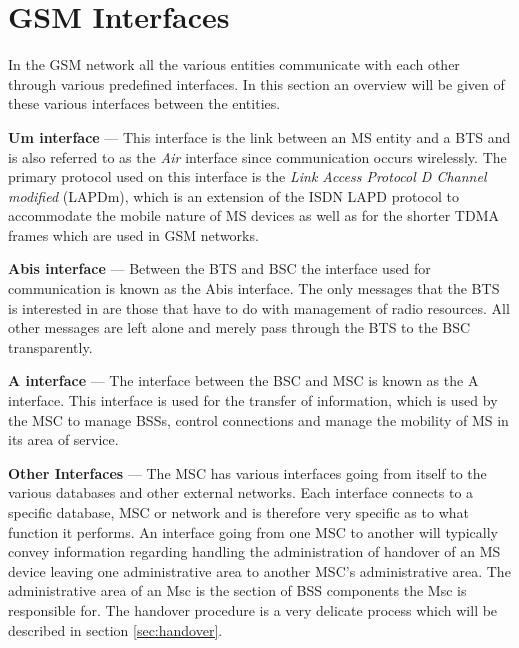 \section{GSM Interfaces}
\label{sec:gsminterfaces}
In the GSM network all the various entities communicate with each other through various predefined interfaces. In this section an overview will be given of these various interfaces between the entities.
\begin{description}
\item{\textbf{Um interface}} --- This interface is the link between an MS entity and a BTS and is also referred to as the \emph{Air} interface since communication occurs wirelessly. The primary protocol used on this interface is the \emph{Link Access Protocol D Channel modified} (LAPDm), which is an extension of the ISDN LAPD protocol to accommodate the mobile nature of MS devices as well as for the shorter TDMA frames which are used in GSM networks\cite{wirelesstelcoMullet,GSMSecurInTeleNetwork}.
\item{\textbf{Abis interface}} --- Between the BTS and BSC the interface used for communication is known as the Abis interface. The only messages that the BTS is interested in are those that have to do with management of radio resources\cite{wirelesstelcoMullet,GSMSecurInTeleNetwork}. All other messages are left alone and merely pass through the BTS to the BSC transparently.
\item{\textbf{A interface}} --- The interface between the BSC and MSC is known as the A interface. This interface is used for the transfer of information, which is used by the MSC to manage BSSs, control connections and manage the mobility of MS in its area of service\cite{wirelesstelcoMullet,GSMArchitectureProtocolsServices}.
\item{\textbf{Other Interfaces}} --- The MSC has various interfaces going from itself to the various databases and other external networks. Each interface connects to a specific database, MSC or network and is therefore very specific as to what function it performs\cite{wirelesstelcoMullet,GSMArchitectureProtocolsServices}. An interface going from one MSC to another will typically convey information regarding handling the administration of handover of an MS device leaving one administrative area to another MSC's administrative area. The administrative area of an Msc is the section of BSS components the Msc is responsible for. The handover procedure is a very delicate process which will be described in section \ref{sec:handover}.
\end{description}

